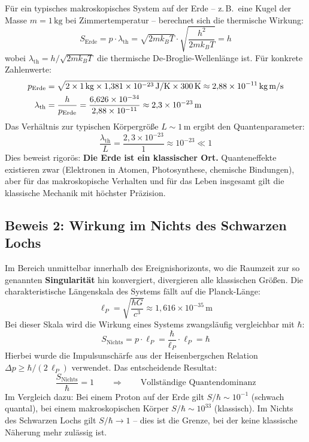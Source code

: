 ﻿\documentclass[12pt,a4paper]{report}
\begin{document}
Für ein typisches makroskopisches System auf der Erde -- z.\,B.\ eine Kugel der Masse $m = 1\,\text{kg}$ bei Zimmertemperatur -- berechnet sich die thermische Wirkung:
\begin{equation}
    S_{\text{Erde}} = p \cdot \lambda_{\text{th}} = \sqrt{2mk_BT} \cdot \sqrt{\frac{h^2}{2mk_BT}} = h
    \label{eq:wirkung_erde_1}
\end{equation}
wobei $\lambda_{\text{th}} = h/\sqrt{2mk_BT}$ die thermische De-Broglie-Wellenlänge ist. Für konkrete Zahlenwerte:
\begin{align}
    p_{\text{Erde}} &= \sqrt{2 \times 1\,\text{kg} \times 1{,}381 \times 10^{-23}\,\text{J/K} \times 300\,\text{K}} \approx 2{,}88 \times 10^{-11}\,\text{kg\,m/s} \\
    \lambda_{\text{th}} &= \frac{h}{p_{\text{Erde}}} = \frac{6{,}626 \times 10^{-34}}{2{,}88 \times 10^{-11}} \approx 2{,}3 \times 10^{-23}\,\text{m}
\end{align}
Das Verhältnis zur typischen Körpergröße $L \sim 1\,\text{m}$ ergibt den Quantenparameter:
\begin{equation}
    \frac{\lambda_{\text{th}}}{L} = \frac{2{,}3 \times 10^{-23}}{1} \approx 10^{-23} \ll 1
    \label{eq:quanten_erde}
\end{equation}
Dies beweist rigorös: \textbf{Die Erde ist ein klassischer Ort.} Quanteneffekte existieren zwar (Elektronen in Atomen, Photosynthese, chemische Bindungen), aber für das makroskopische Verhalten und für das Leben insgesamt gilt die klassische Mechanik mit höchster Präzision.

\subsection{Beweis 2: Wirkung im Nichts des Schwarzen Lochs}

Im Bereich unmittelbar innerhalb des Ereignishorizonts, wo die Raumzeit zur so genannten \textbf{Singularität} hin konvergiert, divergieren alle klassischen Größen. Die charakteristische Längenskala des Systems fällt auf die Planck-Länge:
\begin{equation}
    \ell_P = \sqrt{\frac{\hbar G}{c^3}} \approx 1{,}616 \times 10^{-35}\,\text{m}
    \label{eq:planck_laenge}
\end{equation}
Bei dieser Skala wird die Wirkung eines Systems zwangsläufig vergleichbar mit $\hbar$:
\begin{equation}
    S_{\text{Nichts}} = p \cdot \ell_P = \frac{\hbar}{\ell_P} \cdot \ell_P = \hbar
    \label{eq:wirkung_nichts}
\end{equation}
Hierbei wurde die Impulsunschärfe aus der Heisenbergschen Relation $\Delta p \geq \hbar / (2\,\ell_P)$ verwendet. Das entscheidende Resultat:
\begin{equation}
    \boxed{\frac{S_{\text{Nichts}}}{\hbar} = 1 \qquad \Longrightarrow \qquad \text{Vollständige Quantendominanz}}
\end{equation}
Im Vergleich dazu: Bei einem Proton auf der Erde gilt $S/\hbar \sim 10^{-1}$ (schwach quantal), bei einem makroskopischen Körper $S/\hbar \sim 10^{33}$ (klassisch). Im Nichts des Schwarzen Lochs gilt $S/\hbar \rightarrow 1$ -- dies ist die Grenze, bei der keine klassische Näherung mehr zulässig ist.
\end{document}

